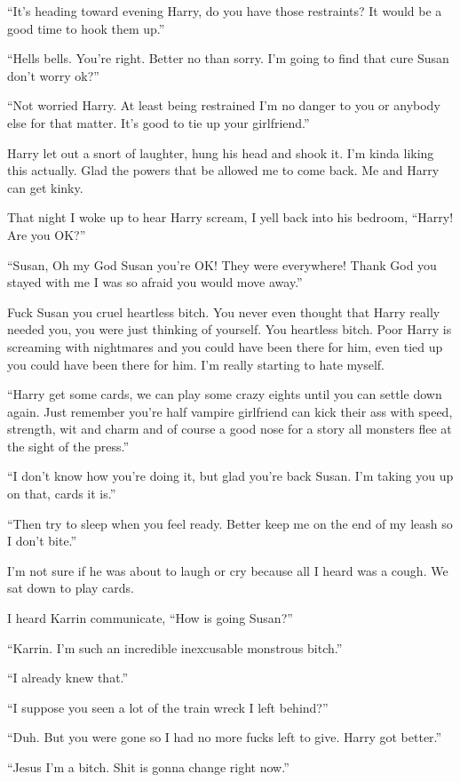 ``It's heading toward evening Harry, do you have those restraints? It would be a good time to hook them up.''

``Hells bells. You're right. Better no than sorry. I'm going to find that cure Susan don't worry ok?''

``Not worried Harry. At least being restrained I'm no danger to you or anybody else for that matter. It's good to tie up your girlfriend.''

Harry let out a snort of laughter, hung his head and shook it. I'm kinda liking this actually. Glad the powers that be allowed me to come back. Me and Harry can get kinky.

That night I woke up to hear Harry scream, I yell back into his bedroom, ``Harry! Are you OK?''

``Susan, Oh my God Susan you're OK! They were everywhere! Thank God you stayed with me I was so afraid you would move away.''

Fuck Susan you cruel heartless bitch. You never even thought that Harry really needed you, you were just thinking of yourself. You heartless bitch. Poor Harry is screaming with nightmares and you could have been there for him, even tied up you could have been there for him. I'm really starting to hate myself.

``Harry get some cards, we can play some crazy eights until you can settle down again. Just remember you're half vampire girlfriend can kick their ass with speed, strength, wit and charm and of course a good nose for a story all monsters flee at the sight of the press.''

``I don't know how you're doing it, but glad you're back Susan. I'm taking you up on that, cards it is.''

``Then try to sleep when you feel ready. Better keep me on the end of my leash so I don't bite.''

I'm not sure if he was about to laugh or cry because all I heard was a cough. We sat down to play cards.

I heard Karrin communicate, ``How is going Susan?''

``Karrin. I'm such an incredible inexcusable monstrous bitch.''

``I already knew that.''

``I suppose you seen a lot of the train wreck I left behind?''

``Duh. But you were gone so I had no more fucks left to give. Harry got better.''

``Jesus I'm a bitch. Shit is gonna change right now.''

